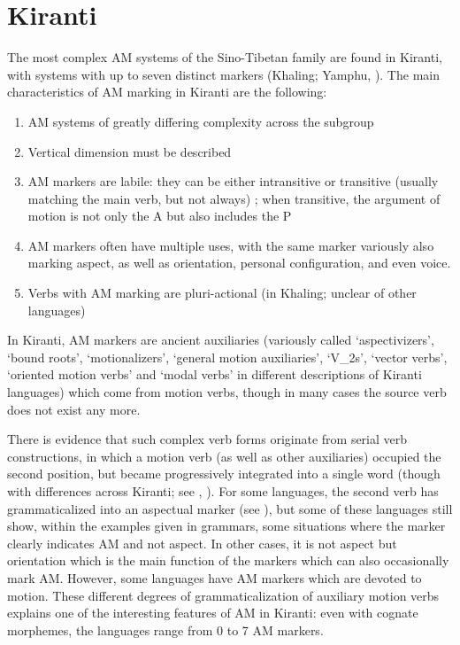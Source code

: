 \documentclass[oneside,a4paper,11pt]{article}
\begin{document}
\section{Kiranti}  
The most complex AM systems of the Sino-Tibetan family are found in Kiranti, with systems with up to seven distinct markers (Khaling; Yamphu, \citealt[137-194]{rutgers98yamphu}).
The main characteristics of AM marking in Kiranti are the following:

\begin{enumerate}
\item AM systems of greatly differing complexity across the subgroup
\item Vertical dimension must be described
\item AM markers are labile: they can be either intransitive or transitive (usually matching the main verb, but not always) ; when transitive, the argument of motion is not only the A but also includes the P
\item AM markers often have multiple uses, with the same marker variously also marking aspect, as well as orientation, personal configuration, and even voice.
\item Verbs with AM marking are pluri-actional (in Khaling; unclear of other languages)
\end{enumerate}


In Kiranti, AM markers are ancient auxiliaries (variously called `aspectivizers', `bound roots', `motionalizers',   `general motion auxiliaries', `V_2s', `vector verbs', `oriented motion verbs' and `modal verbs' in different descriptions of Kiranti languages) which come from motion verbs, though in many cases the source verb does not exist any more. 
 

There is evidence that such complex verb forms originate from serial verb constructions, in which a motion verb (as well as other auxiliaries) occupied the second position, but became progressively integrated into a single word (though with differences across Kiranti; see \citealt{bickel07chintang}, \citealt{schiering10prosodic}). For some languages, the second verb has grammaticalized into an aspectual marker (see \citealt{bickel96aspect}), but some of these languages still show, within the examples given in grammars, some situations where the marker clearly indicates AM and not aspect.  In other cases, it is not aspect but orientation which is the main function of the markers which can also occasionally mark AM.  However, some languages have AM markers which are devoted to motion.  These different degrees of grammaticalization of auxiliary motion verbs explains one of the interesting features of AM in Kiranti: even with cognate morphemes, the languages range from 0 to 7 AM markers. 
\end{document}
